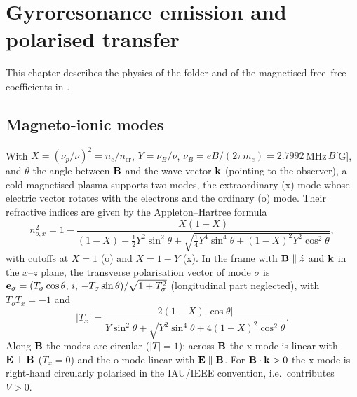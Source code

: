 \chapter{Gyroresonance emission and polarised transfer}\label{chap:grtheory}

This chapter describes the physics of the  folder and of the
magnetised free--free coefficients in .

\section{Magneto-ionic modes}
With $X=(\nu_p/\nu)^2=n_e/n_\text{cr}$, $Y=\nu_B/\nu$, $\nu_B=eB/(2\pi m_e)=2.7992$\,MHz\,$B$[G],
and $\theta$ the angle between $\mathbf{B}$ and the wave vector $\mathbf{k}$ (pointing to the
observer), a cold magnetised plasma supports two modes, the extraordinary (x) mode whose
electric vector rotates with the electrons and the ordinary (o) mode. Their refractive
indices are given by the Appleton--Hartree formula
\begin{equation}
  n_{o,x}^2 = 1-\frac{X(1-X)}{(1-X)-\tfrac12Y^2\sin^2\theta\pm\sqrt{\tfrac14Y^4\sin^4\theta+(1-X)^2Y^2\cos^2\theta}},
\end{equation}
with cutoffs at $X=1$ (o) and $X=1-Y$ (x). In the frame with $\mathbf{B}\parallel\hat z$ and
$\mathbf{k}$ in the $x$--$z$ plane, the transverse polarisation vector of mode $\sigma$ is
$\mathbf{e}_\sigma=(T_\sigma\cos\theta,\,i,\,-T_\sigma\sin\theta)/\sqrt{1+T_\sigma^2}$
(longitudinal part neglected), with $T_oT_x=-1$ and
\begin{equation}
  |T_x| = \frac{2(1-X)|\cos\theta|}{Y\sin^2\theta+\sqrt{Y^2\sin^4\theta+4(1-X)^2\cos^2\theta}} .
\end{equation}
Along $\mathbf{B}$ the modes are circular ($|T|=1$); across $\mathbf{B}$ the x-mode is linear with
$\mathbf{E}\perp\mathbf{B}$ ($T_x=0$) and the o-mode linear with $\mathbf{E}\parallel\mathbf{B}$.
For $\mathbf{B}\cdot\mathbf{k}>0$ the x-mode is right-hand circularly polarised in the IAU/IEEE
convention, i.e.\ contributes $V>0$.

